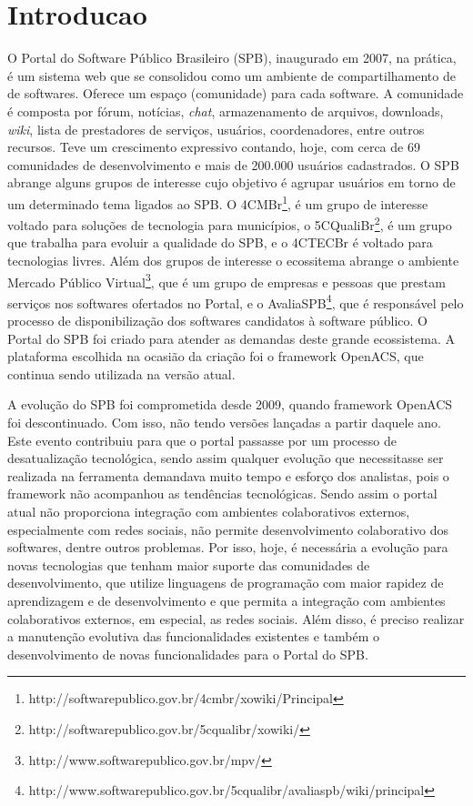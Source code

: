﻿\section{Introducao}
\label{sec:introducao}

O Portal do Software Público Brasileiro (SPB), inaugurado em 2007, na prática,
é um sistema web que se consolidou como um ambiente de compartilhamento de
de softwares.
%
Oferece um espaço (comunidade) para cada software. A comunidade é composta por
fórum, notícias, {\it chat}, armazenamento de arquivos, downloads, {\it wiki}, lista de
prestadores de serviços, usuários, coordenadores, entre outros recursos.
%
Teve um crescimento expressivo contando, hoje, com cerca de 69 comunidades de
desenvolvimento e mais de 200.000 usuários cadastrados.
%
O SPB abrange alguns grupos de interesse cujo objetivo é agrupar usuários em torno de um determinado tema ligados ao SPB. O 4CMBr\footnote{http://softwarepublico.gov.br/4cmbr/xowiki/Principal}, é um grupo de interesse voltado para soluções
de tecnologia para municípios, o 5CQualiBr\footnote{http://softwarepublico.gov.br/5cqualibr/xowiki/}, é um grupo que trabalha para
evoluir a qualidade do SPB, e o 4CTECBr é voltado para tecnologias livres.
%
Além dos grupos de interesse o ecossitema abrange o ambiente Mercado Público Virtual\footnote{http://www.softwarepublico.gov.br/mpv/}, que é um
grupo de empresas e pessoas que prestam serviços nos softwares ofertados no
Portal, e o AvaliaSPB\footnote{http://www.softwarepublico.gov.br/5cqualibr/avaliaspb/wiki/principal}, que é responsável pelo processo de disponibilização dos softwares candidatos à software
público.
%
O Portal do SPB foi criado para atender as demandas deste grande ecossistema. A plataforma escolhida na ocasião da
criação foi o framework OpenACS, que continua sendo utilizada na versão atual.


A evolução do SPB foi comprometida desde 2009, quando framework OpenACS foi 
descontinuado. Com isso, não tendo versões lançadas a partir daquele ano.
%
Este evento contribuiu para que o portal passasse por um processo de desatualização tecnológica, sendo assim qualquer evolução que necessitasse ser realizada na ferramenta demandava muito tempo e esforço dos analistas, 
pois o framework não acompanhou as tendências tecnológicas. Sendo assim o portal atual não proporciona integração com ambientes colaborativos
externos, especialmente com redes sociais, não permite desenvolvimento colaborativo dos softwares, dentre outros problemas.
Por isso, hoje, é necessária a evolução para novas tecnologias que tenham maior
suporte das comunidades de desenvolvimento, que utilize linguagens de programação
com maior rapidez de aprendizagem e de desenvolvimento e que permita a integração
com ambientes colaborativos externos, em especial, as redes sociais.
%
Além disso, é preciso realizar a manutenção evolutiva das funcionalidades
existentes e também o desenvolvimento de novas funcionalidades para o Portal
do SPB.



